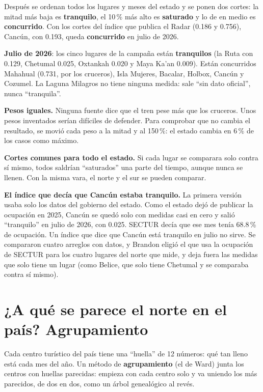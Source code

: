 Después se ordenan todos los lugares y meses del estado y se ponen dos cortes: la mitad más baja es
\textbf{tranquilo}, el 10\,\% más alto es \textbf{saturado} y lo de en medio es \textbf{concurrido}. Con los cortes del
índice que publica el Radar (0.186 y 0.756), Cancún, con 0.193, queda \textbf{concurrido} en julio de 2026.

\textbf{Julio de 2026}: los cinco lugares de la campaña están \textbf{tranquilos} (la Ruta con 0.129, Chetumal 0.025,
Oxtankah 0.020 y Maya Ka'an 0.009). Están concurridos Mahahual (0.731, por los cruceros), Isla Mujeres, Bacalar, Holbox,
Cancún y Cozumel. La Laguna Milagros no tiene ninguna medida: sale ``sin dato oficial'', nunca ``tranquila''.

\begin{porque}
\textbf{Pesos iguales.} Ninguna fuente dice que el tren pese más que los cruceros. Unos pesos inventados serían difíciles
de defender. Para comprobar que no cambia el resultado, se movió cada peso a la mitad y al 150\,\%: el estado cambia en
6\,\% de los casos como máximo.

\textbf{Cortes comunes para todo el estado.} Si cada lugar se comparara solo contra sí mismo, todos saldrían ``saturados''
una parte del tiempo, aunque nunca se llenen. Con la misma vara, el norte y el sur se pueden comparar.
\end{porque}

\begin{error}
\textbf{El índice que decía que Cancún estaba tranquilo.} La primera versión usaba solo los datos del gobierno del estado.
Como el estado dejó de publicar la ocupación en 2025, Cancún se quedó solo con medidas casi en cero y salió
``tranquilo'' en julio de 2026, con 0.025. SECTUR decía que ese mes tenía 68.8\,\% de ocupación. Un índice que dice que
Cancún está tranquilo en julio no sirve. Se compararon cuatro arreglos con datos, y Brandon eligió el que usa la ocupación
de SECTUR para los cuatro lugares del norte que mide, y deja fuera las medidas que solo tiene un lugar (como Belice, que
solo tiene Chetumal y se comparaba contra sí mismo).
\end{error}

\section{¿A qué se parece el norte en el país? Agrupamiento}
Cada centro turístico del país tiene una ``huella'' de 12 números: qué tan lleno está cada mes del año. Un método de
\textbf{agrupamiento} (el de Ward) junta los centros con huellas parecidas: empieza con cada centro solo y va uniendo los
más parecidos, de dos en dos, como un árbol genealógico al revés.

